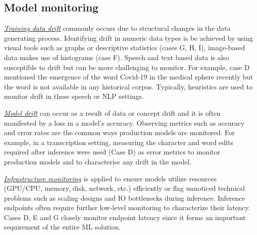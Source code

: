 \subsection{Model monitoring} 

\underline{\emph{Training data drift}} commonly occurs due to structural changes in the data generating process. Identifying drift in numeric data types is be achieved by using visual tools such as graphs or descriptive statistics (cases G, H, I), image-based data makes use of histograms (case F). Speech and text based data is also susceptible to drift but can be more challenging to monitor. For example, case D mentioned the emergence of the word Covid-19 in the medical sphere recently but the word is not available in any historical corpus. Typically, heuristics are used to monitor drift in these speech or NLP settings.

\underline{\emph{Model drift}} can occur as a result of data or concept drift and it is often manifested by a loss in a model's accuracy. Observing metrics such as accuracy and error rates are the common ways production models are monitored. For example, in a transcription setting, measuring the character and word edits required after inference were used (Case D) as error metrics to monitor production models and to characterise any drift in the model.

\underline{\emph{Infrastructure monitoring}} is applied to ensure models utilize resources (GPU/CPU, memory, disk, network, etc.) efficiently or flag unnoticed technical problems such as scaling designs and IO bottlenecks during inference. Inference endpoints often require further low-level monitoring to characterize their latency. Cases D, E and G closely monitor endpoint latency since it forms an important requirement of the entire ML solution.


